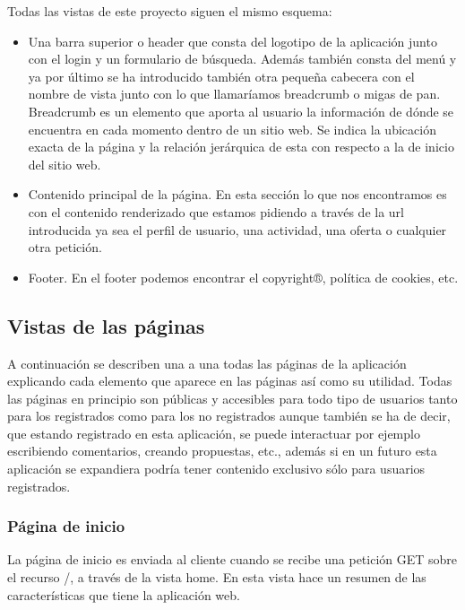 Todas las vistas de este proyecto siguen el mismo esquema:


\begin{itemize}
\item Una barra superior o header que consta del logotipo de la aplicación junto con el login y un formulario de búsqueda. Además también consta del menú y ya por último se ha introducido también otra pequeña cabecera con el nombre de vista junto con lo que llamaríamos breadcrumb o migas de pan.  Breadcrumb es un elemento que aporta al usuario la información de dónde se encuentra en cada momento dentro de un sitio web. Se indica la ubicación exacta de la página y la relación jerárquica de esta con respecto a la de inicio del sitio web.
\item Contenido principal de la página. En esta sección lo que nos encontramos es con el contenido renderizado que estamos pidiendo a través de la url introducida ya sea el perfil de usuario, una actividad, una oferta o cualquier otra petición.
\item Footer. En el footer podemos encontrar el copyright®, política de cookies, etc.
\end{itemize}


\subsection{Vistas de las páginas} 
\label{subsec:vistas}

A continuación se describen una a una todas las páginas de la aplicación explicando cada elemento que aparece en las páginas así como su utilidad. Todas las páginas en principio son públicas y accesibles para todo tipo de usuarios tanto para los registrados como para los no registrados aunque también se ha de decir, que estando registrado en esta aplicación, se puede interactuar por ejemplo escribiendo comentarios, creando propuestas, etc., además si en un futuro esta aplicación se expandiera podría tener contenido exclusivo sólo para usuarios registrados.


\subsubsection{Página de inicio}
\label{subsubsec:home}


La página de inicio es enviada al cliente cuando se recibe una petición GET sobre el recurso /, a través de la vista home. En esta vista hace un resumen de las características que tiene la aplicación web.

